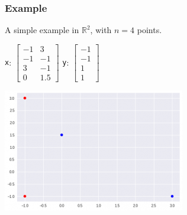 \documentclass{beamer}
\theoremstyle{example}
\newcommand{\ttt}[1]{{\small\texttt{#1}}}
\begin{document}
\begin{frame}
    \frametitle{Example}
    A simple example in $\mathbb R^2$, with $n=4$ points.

    \begin{center}
    \ttt{x}: $\begin{bmatrix}-1 & 3 \\ -1 & -1 \\ 3 & -1 \\ 0 & 1.5\end{bmatrix}$  \qquad\qquad
    \ttt{y}: $\begin{bmatrix}-1 \\ -1 \\ 1 \\ 1\end{bmatrix}$
    \end{center}

    \centering
    \includegraphics[height=0.3\textheight]{../../Images/ex2_data_halfspace.png}
\end{frame}
\end{document}
